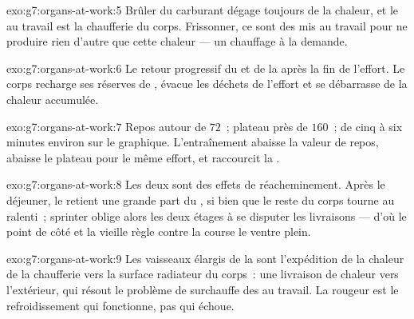 \begin{solution}{exo:g7:organs-at-work:5}
Brûler du carburant dégage toujours de la chaleur, et le  au
travail est la chaufferie du corps. Frissonner, ce sont des 
mis au travail pour ne produire rien d'autre que cette chaleur ---
un chauffage à la demande.
\end{solution}

\begin{solution}{exo:g7:organs-at-work:6}
Le retour progressif du  et de la  après la fin de
l'effort. Le corps recharge ses réserves de , évacue les
déchets de l'effort et se débarrasse de la chaleur accumulée.
\end{solution}

\begin{solution}{exo:g7:organs-at-work:7}
Repos autour de $72$~; plateau près de $160$~;  de cinq
à six minutes environ sur le graphique. L'entraînement abaisse la
valeur de repos, abaisse le plateau pour le même effort, et raccourcit
la .
\end{solution}

\begin{solution}{exo:g7:organs-at-work:8}
Les deux sont des effets de réacheminement. Après le déjeuner, le
 retient une grande part du , si bien que le reste
du corps tourne au ralenti~; sprinter oblige alors les deux étages à
se disputer les livraisons --- d'où le point de côté et la vieille
règle contre la course le ventre plein.
\end{solution}

\begin{solution}{exo:g7:organs-at-work:9}
Les vaisseaux élargis de la  sont l'expédition de la chaleur de
la chaufferie vers la surface radiateur du corps~: une livraison de
chaleur vers l'extérieur, qui résout le problème de surchauffe des
 au travail. La rougeur est le refroidissement qui
fonctionne, pas qui échoue.
\end{solution}


